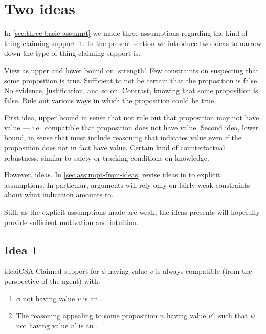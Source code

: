 \section{Two ideas}
\label{sec:two-ideas}

\begin{note}
  In \ref{sec:three-basic-assumpt} we made three assumptions regarding the kind of thing claiming support it.
  In the present section we introduce two ideas to narrow down the type of thing claiming support is.

  View as upper and lower bound on `strength'.
  Few constraints on suspecting that some proposition is true.
  Sufficient to not be certain that the proposition is false.
  No evidence, justification, and so on.
  Contrast, knowing that some proposition is false.
  Rule out various ways in which the proposition could be true.

  First idea, upper bound in sense that not rule out that proposition may not have value --- i.e.\ compatible that proposition does not have value.
  Second idea, lower bound, in sense that must include reasoning that indicates value even if the proposition does not in fact have value.
  Certain kind of counterfactual robustness, similar to safety or tracking conditions on knowledge.

  However, ideas.
  In \ref{sec:assumpt-from-ideas} revise ideas in to explicit assumptions.
  In particular, arguments will rely only on fairly weak constraints about what indication amounts to.

  Still, as the explicit assumptions made are weak, the ideas presents will hopefully provide sufficient motivation and intuition.
  \end{note}

\subsection{Idea 1}
\label{sec:idea-1}

\begin{note}
  \begin{restatable}{idea}{iCSA}
    \label{idea:defs-for-CS}
    Claimed support for \(\phi\) having value \(v\) is always compatible (from the perspective of the agent) with:
    \begin{enumerate}
    \item
      \(\phi\) not having value \(v\) is an \ep{}.
    \item
      The reasoning appealing to some proposition \(\psi\) having value \(v'\), such that \(\psi\) not having value \(v'\) is an \ep{}.
    \end{enumerate}
    \vspace{-\baselineskip}
  \end{restatable}
\end{note}

